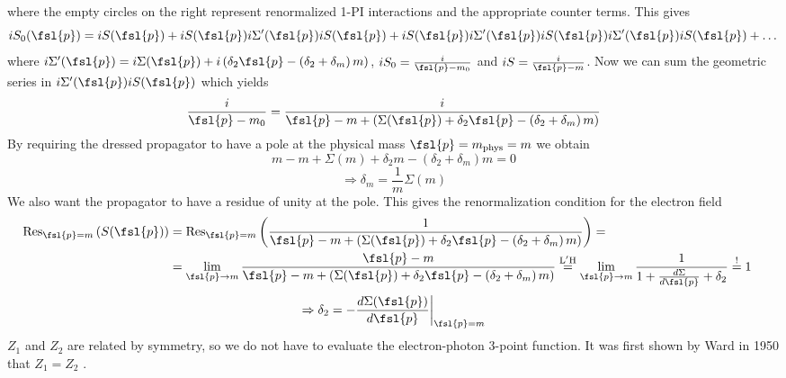 where the empty circles on the right represent renormalized 1-PI interactions and the appropriate counter terms. This gives
\begin{equation}
iS_0(\fsl{p}) = iS(\fsl{p}) + iS(\fsl{p}) i\Sigma'(\fsl{p}) iS(\fsl{p}) + iS(\fsl{p}) i\Sigma'(\fsl{p}) iS(\fsl{p}) i\Sigma'(\fsl{p}) iS(\fsl{p}) + \dots
\end{equation}
where $i\Sigma'(\fsl{p}) = i\Sigma(\fsl{p}) + i \left( \delta_2 \fsl{p} - \left( \delta_2 + \delta_m \right) m \right)$, $iS_0 = \frac{i}{\fsl{p} - m_0}$ and $iS = \frac{i}{\fsl{p} - m}$. Now we can sum the geometric series in $i\Sigma'(\fsl{p})iS(\fsl{p})$ which yields
\begin{equation}
\frac{i}{\fsl{p}-m_0} = \frac{i}{\fsl{p} - m + \left( \Sigma(\fsl{p}) + \delta_2 \fsl{p} - \left( \delta_2 + \delta_m \right) m \right)}
\end{equation}
By requiring the dressed propagator to have a pole at the physical mass $\fsl{p} = m_{\mathrm{phys}} = m$ we obtain 
\begin{equation}
m - m + \Sigma(m) + \delta_2 m - \left( \delta_2 + \delta_m \right) m = 0
\end{equation}
\begin{equation}
\label{eqn:dm}
\Rightarrow \delta_m = \frac{1}{m} \Sigma(m)
\end{equation}
We also want the propagator to have a residue of unity at the pole. This gives the renormalization condition for the electron field
\begin{align*}
\mathrm{Res}_{\fsl{p} = m} \left( S(\fsl{p}) \right) & = \mathrm{Res}_{\fsl{p} = m} \left( \frac{1}{\fsl{p} - m + \left( \Sigma(\fsl{p}) + \delta_2 \fsl{p} - \left( \delta_2 + \delta_m \right) m \right)} \right) = & \\
& = \lim_{\fsl{p} \rightarrow m} \frac{\fsl{p} - m}{\fsl{p} - m + \left( \Sigma(\fsl{p}) + \delta_2 \fsl{p} - \left( \delta_2 + \delta_m \right) m \right)} \overset{\mathrm{L'H}}{=} \lim_{\fsl{p} \rightarrow m} \frac{1}{1 + \frac{d\Sigma}{d\fsl{p}} + \delta_2} \overset{\mathrm{!}}{=} 1 &
\end{align*}
\begin{equation}
\label{eqn:d2}
\Rightarrow \delta_2 = - \frac{d\Sigma(\fsl{p})}{d\fsl{p}} \biggr\rvert_{\fsl{p} = m}
\end{equation}
$Z_1$ and $Z_2$ are related by symmetry, so we do not have to evaluate the electron-photon 3-point function. It was first shown by Ward in 1950 that $Z_1 = Z_2$ \cite{WardId}. \\
